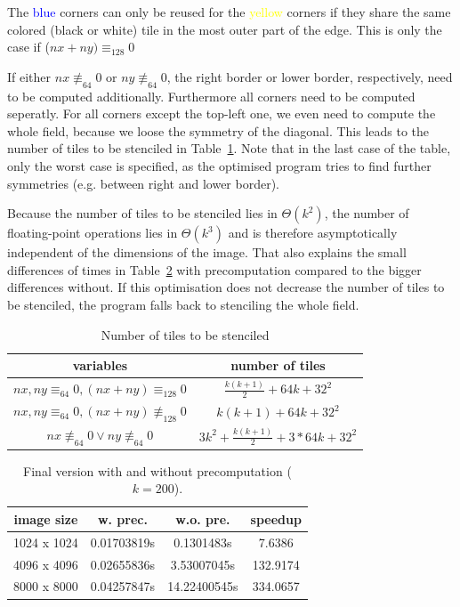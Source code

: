 \documentclass[letterpaper,twocolumn,10pt]{article}
\begin{document}
The \textcolor{blue}{blue} corners can only be reused for the \textcolor{yellow}{yellow} corners
if they share the same colored (black or white) tile in the most outer part of the edge. This is only the
case if ($nx + ny) \equiv_{128} 0$

If either $nx \not\equiv_{64} 0$ or $ny \not\equiv_{64}0$, the right border or lower border, respectively, need to be computed additionally.
Furthermore all corners need to be computed seperatly. For all corners except the top-left one,
we even need to compute the whole field, because we loose the symmetry of the diagonal.  
This leads to the number of tiles to be stenciled in Table~\ref{tab:numstencil}. Note that
in the last case of the table, only the worst case is specified, as the optimised program
tries to find further symmetries (e.g. between right and lower border).

Because the number of tiles to be stenciled lies in $\Theta(k^2)$, the number of floating-point
operations lies in $\Theta(k^3)$ and is therefore asymptotically independent of the dimensions of the image. That also explains the small differences of times in Table~\ref{tab:prec} with precomputation compared to the bigger differences without.
If this optimisation does not decrease the number of tiles to be stenciled, the program falls back to stenciling the whole field.

\begin{table}[ht]
	\caption{Number of tiles to be stenciled}
	\begin{tabular}{c c}
		variables & number of tiles\\
		\hline
		$\scriptstyle nx,ny \equiv_{64}0,(nx+ny) \equiv_{128}0$ & $ \frac{k(k+1)}{2} + 64k + 32^{2}$\\
		$\scriptstyle nx,ny \equiv_{64}0,(nx+ny) \not\equiv_{128}0$ & $ k(k+1) + 64k + 32^{2}$\\
		$\scriptstyle nx \not\equiv_{64}0 \lor \scriptstyle ny \not\equiv_{64}0$ & $ 3k^{2} + \frac{k(k+1)}{2} + 3 * 64k + 32^{2}$\\
	\end{tabular}
	\label{tab:numstencil}
\end{table}


\begin{table}[ht]
	\caption{Final version with and without precomputation ($k=200$).}
	\begin{tabular}{c c c c}
		image size    & w. prec.   & w.o. pre.    & speedup   \\
		 \hline
		 1024 x 1024 & 0.01703819s & 0.1301483s   & 7.6386    \\
		 4096 x 4096 & 0.02655836s & 3.53007045s  & 132.9174  \\
		 8000 x 8000 & 0.04257847s & 14.22400545s & 334.0657  \\
	\end{tabular}
	\label{tab:prec}
\end{table}
\end{document}
